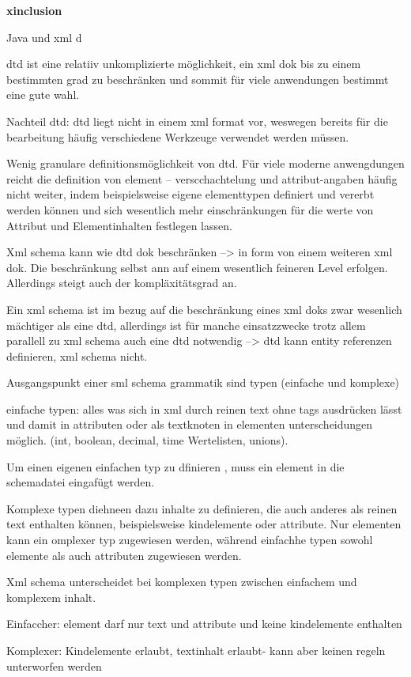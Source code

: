 \textbf{xinclusion}

Java und xml d

dtd ist eine relatiiv unkomplizierte möglichkeit, ein xml dok bis zu einem bestimmten grad zu beschränken und sommit für viele anwendungen bestimmt eine gute wahl.

Nachteil dtd: dtd liegt nicht in einem xml format vor, weswegen bereits für die bearbeitung häufig verschiedene Werkzeuge verwendet werden müssen.

Wenig granulare definitionsmöglichkeit von dtd. Für viele moderne anwengdungen reicht die definition von element – verscchachtelung und attribut-angaben häufig nicht weiter, indem beispielsweise eigene elementtypen definiert und vererbt werden können und sich wesentlich mehr einschränkungen für die werte von Attribut und Elementinhalten festlegen lassen.

Xml schema kann wie dtd dok beschränken --> in form von einem weiteren xml dok. Die beschränkung selbst ann auf einem wesentlich feineren Level erfolgen. Allerdings steigt auch der kompläxitätsgrad an.

Ein xml schema ist im bezug auf die beschränkung eines xml doks zwar wesenlich mächtiger als eine dtd, allerdings ist für manche einsatzzwecke trotz allem parallell zu xml schema auch eine dtd notwendig --> dtd kann entity referenzen definieren, xml schema nicht.

Ausgangspunkt einer sml schema grammatik sind typen (einfache und komplexe) 

einfache typen: alles was sich in xml durch reinen text ohne tags ausdrücken lässt und damit in attributen oder als textknoten in elementen unterscheidungen möglich. (int, boolean, decimal, time Wertelisten, unions).

Um einen eigenen einfachen typ zu dfinieren , muss ein element in die schemadatei eingafügt werden.

Komplexe typen diehneen dazu inhalte zu definieren, die auch anderes als reinen text enthalten können, beispielsweise kindelemente oder attribute. Nur elementen kann ein omplexer typ zugewiesen werden, während einfachhe typen sowohl elemente als auch attributen zugewiesen werden.

Xml schema unterscheidet bei komplexen typen zwischen einfachem und komplexem inhalt.

Einfaccher: element darf nur text und attribute und keine kindelemente enthalten

Komplexer: Kindelemente erlaubt, textinhalt erlaubt- kann aber keinen regeln unterworfen werden

